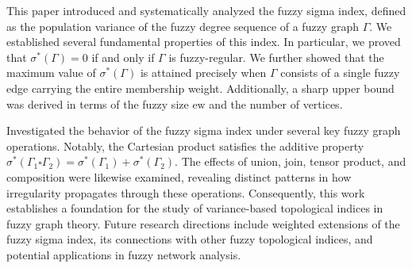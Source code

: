 \documentclass[12pt]{amsart}
\newcommand{\ew}{\mathrm{ew}}
\newcommand{\SF}{\sigma^*}
\newcommand{\SFG}{\sigma^*(\Gamma)}
\begin{document}
This paper introduced and systematically analyzed the fuzzy sigma index, defined as the population variance of the fuzzy degree sequence of a fuzzy graph $\Gamma$.  We established several fundamental properties of this index. In particular, we proved that $\SF(\Gamma) = 0$ if and only if $\Gamma$ is fuzzy-regular. We further showed that the maximum value of $\SFG$ is attained precisely when $\Gamma$ consists of a single fuzzy edge carrying the entire membership weight. Additionally, a sharp upper bound was derived in terms of the fuzzy size $\ew$ and the number of vertices.


Investigated the behavior of the fuzzy sigma index under several key fuzzy graph operations. Notably, the Cartesian product satisfies the additive property $\SF(\Gamma_1 \square \Gamma_2) = \SF(\Gamma_1) + \SF(\Gamma_2)$. The effects of union, join, tensor product, and composition were likewise examined, revealing distinct patterns in how irregularity propagates through these operations.
Consequently, this work establishes a foundation for the study of variance-based topological indices in fuzzy graph theory. Future research directions include weighted extensions of the fuzzy sigma index, its connections with other fuzzy topological indices, and potential applications in fuzzy network analysis.
\end{document}
